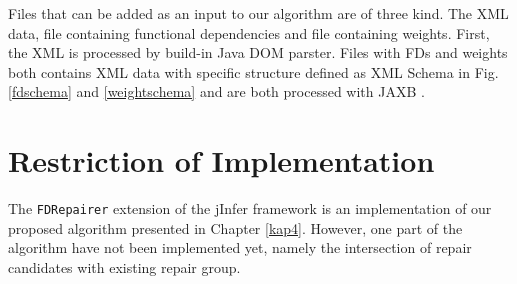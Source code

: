 Files that can be added as an input to our algorithm are of three kind. The XML data, file containing functional dependencies and file containing weights. First, the XML is processed by build-in Java DOM parster. Files with FDs and weights both contains XML data with specific structure defined as XML Schema in Fig. \ref{fdschema} and \ref{weightschema} and are both processed with JAXB \cite{JAXB}.


\section{Restriction of Implementation}

The \texttt{FDRepairer} extension of the jInfer framework is an implementation of our proposed algorithm presented in Chapter \ref{kap4}. However, one part of the algorithm have not been implemented yet, namely the intersection of repair candidates with existing repair group.
